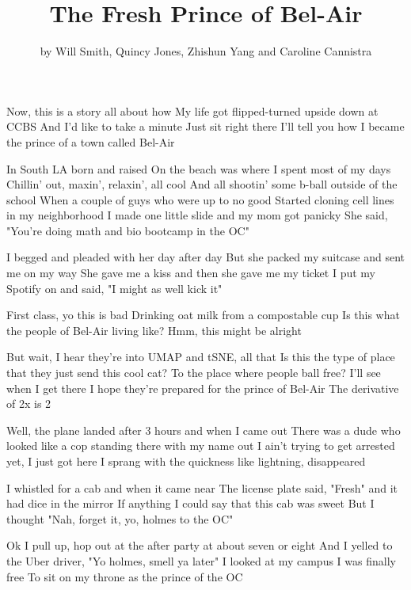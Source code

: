 \documentclass{article}
\title{The Fresh Prince of Bel-Air}
\author{by Will Smith, Quincy Jones, Zhishun Yang and Caroline Cannistra}
\begin{document}
\maketitle

Now, this is a story all about how
My life got flipped-turned upside down
at CCBS
And I'd like to take a minute
Just sit right there
I'll tell you how I became the prince of a town called Bel-Air

In South LA born and raised
On the beach was where I spent most of my days
Chillin' out, maxin', relaxin', all cool
And all shootin' some b-ball outside of the school
When a couple of guys who were up to no good
Started cloning cell lines in my neighborhood
I made one little slide and my mom got panicky
She said, "You're doing math and bio bootcamp in the OC"

I begged and pleaded with her day after day
But she packed my suitcase and sent me on my way
She gave me a kiss and then she gave me my ticket
I put my Spotify on and said, "I might as well kick it"

First class, yo this is bad
Drinking oat milk from a compostable cup
Is this what the people of Bel-Air living like?
Hmm, this might be alright

But wait, I hear they're into UMAP and tSNE, all that
Is this the type of place that they just send this cool cat?
To the place where people ball free?
I'll see when I get there
I hope they're prepared for the prince of Bel-Air
The derivative of 2x is 2

Well, the plane landed after 3 hours and when I came out
There was a dude who looked like a cop standing there with my name out
I ain't trying to get arrested yet, I just got here
I sprang with the quickness like lightning, disappeared

I whistled for a cab and when it came near
The license plate said, "Fresh" and it had dice in the mirror
If anything I could say that this cab was sweet
But I thought "Nah, forget it, yo, holmes to the OC"

Ok I pull up, hop out at the after party at about seven or eight
And I yelled to the Uber driver, "Yo holmes, smell ya later"
I looked at my campus
I was finally free
To sit on my throne as the prince of the OC
\end{document}
